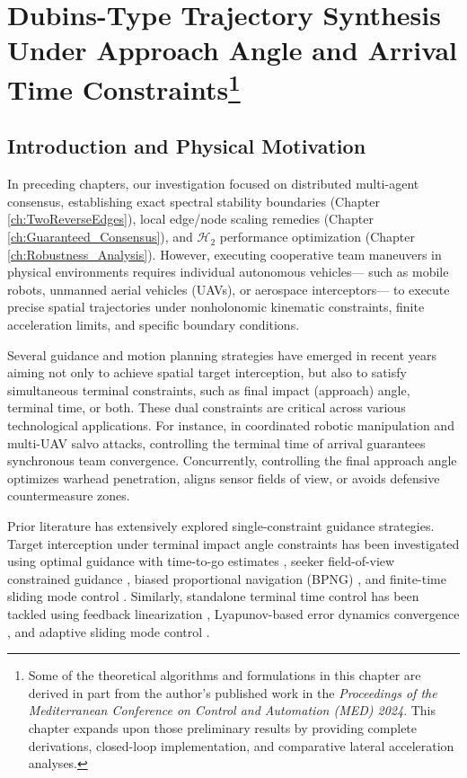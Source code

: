 \chapter[Dubins-Type Trajectory Synthesis Under Terminal Constraints]{Dubins-Type Trajectory Synthesis Under Approach Angle and Arrival Time Constraints\footnote{Some of the theoretical algorithms and formulations in this chapter are derived in part from the author's published work in the \emph{Proceedings of the Mediterranean Conference on Control and Automation (MED) 2024}. This chapter expands upon those preliminary results by providing complete derivations, closed-loop implementation, and comparative lateral acceleration analyses.}}\label{ch:Dubins_Path}
\section{Introduction and Physical Motivation}\label{sec:ch_DP_intro}
In preceding chapters, our investigation focused on distributed multi-agent consensus, establishing exact spectral stability boundaries (Chapter \ref{ch:TwoReverseEdges}), local edge/node scaling remedies (Chapter \ref{ch:Guaranteed_Consensus}), and $\mathcal{H}_2$ performance optimization (Chapter \ref{ch:Robustness_Analysis}). However, executing cooperative team maneuvers in physical environments requires individual autonomous vehicles— such as mobile robots, unmanned aerial vehicles (UAVs), or aerospace interceptors— to execute precise spatial trajectories under nonholonomic kinematic constraints, finite acceleration limits, and specific boundary conditions.

Several guidance and motion planning strategies have emerged in recent years aiming not only to achieve spatial target interception, but also to satisfy simultaneous terminal constraints, such as final impact (approach) angle, terminal time, or both. These dual constraints are critical across various technological applications. For instance, in coordinated robotic manipulation and multi-UAV salvo attacks, controlling the terminal time of arrival guarantees synchronous team convergence. Concurrently, controlling the final approach angle optimizes warhead penetration, aligns sensor fields of view, or avoids defensive countermeasure zones.

Prior literature has extensively explored single-constraint guidance strategies. Target interception under terminal impact angle constraints has been investigated using optimal guidance with time-to-go estimates \cite{zhao2015terminal}, seeker field-of-view constrained guidance \cite{park2013optimal}, biased proportional navigation (BPNG) \cite{kim1998BPNG}, and finite-time sliding mode control \cite{kumar2012sliding}. Similarly, standalone terminal time control has been tackled using feedback linearization \cite{Tekin2016_IT}, Lyapunov-based error dynamics convergence \cite{kim2014lyapunov}, and adaptive sliding mode control \cite{Chen2018_IT}. 

